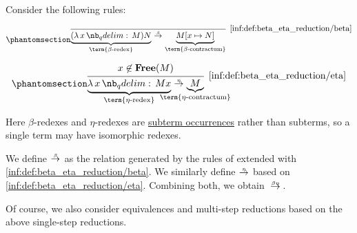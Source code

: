 \begin{definition}\label{def:beta_eta_reduction}
  Consider the following rules:
  \begin{paracol}{2}
    \begin{leftcolumn}
      \ParacolAlignmentHack
      \begin{equation*}\taglabel[\ensuremath{ \logic{Red}_\beta }]{inf:def:beta_eta_reduction/beta}
        \begin{prooftree}
          \infer0[\ref{inf:def:beta_eta_reduction/beta}]{ \underbrace{(\qabs x M) N}_{\T{\term{\( \beta \)-redex}}} \bred \underbrace{M[x \mapsto N]}_{\T{\term{\( \beta \)-contractum}}} },
        \end{prooftree}
      \end{equation*}
    \end{leftcolumn}

    \begin{rightcolumn}
      \ParacolAlignmentHack
      \begin{equation*}\taglabel[\ensuremath{ \logic{Red}_\eta }]{inf:def:beta_eta_reduction/eta}
        \begin{prooftree}
          \hypo{ x \not\in \op*{Free}(M) }
          \infer1[\ref{inf:def:beta_eta_reduction/eta}]{ \underbrace{\qabs x M x}_{\T{\term{\( \eta \)-redex}}} \ered \underbrace{M}_{\mathclap{\T{\term{\( \eta \)-contractum}}}} }.
        \end{prooftree}
      \end{equation*}
    \end{rightcolumn}
  \end{paracol}

  Here \( \beta \)-redexes and \( \eta \)-redexes are \hyperref[def:lambda_subterm_occurrence]{subterm occurrences} rather than subterms, so a single term may have isomorphic redexes.

  We define  \( {\bred} \) as the relation generated by the rules of  extended with \ref{inf:def:beta_eta_reduction/beta}. We similarly define  \( {\ered} \) based on \ref{inf:def:beta_eta_reduction/eta}. Combining both, we obtain  \( {\redrel{\beta\eta}} \).
\end{definition}
\begin{comments}
  \item Of course, we also consider equivalences and multi-step reductions based on the above single-step reductions.
\end{comments}

